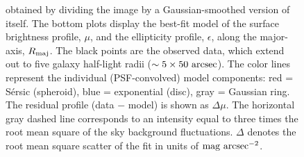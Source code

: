 \documentclass[useAMS,usenatbib,article]{mn2e}
\begin{document}
\begin{figure}
\begin{center}
{obtained by dividing the image by a Gaussian-smoothed version of itself. 
The bottom plots display the best-fit model of the surface brightness profile, $\mu$, 
and the ellipticity profile, $\epsilon$, 
along the major-axis, $R_{\rm maj}$. 
The black points are the observed data, which extend out to five galaxy half-light radii ($\sim 5 \times 50~\rm arcsec$). 
The color lines represent the individual (PSF-convolved) model components: 
red = S\'ersic (spheroid), blue = exponential (disc), gray = Gaussian ring. 
The residual profile (data $-$ model) is shown as $\Delta \mu$. 
The horizontal gray dashed line corresponds to an intensity equal to three times the root mean square of the sky background fluctuations. 
$\Delta$ denotes the root mean square scatter of the fit in units of $\rm mag~arcsec^{-2}$. }
\label{fig:n3115}
\end{center}
\end{figure}
\end{document}
